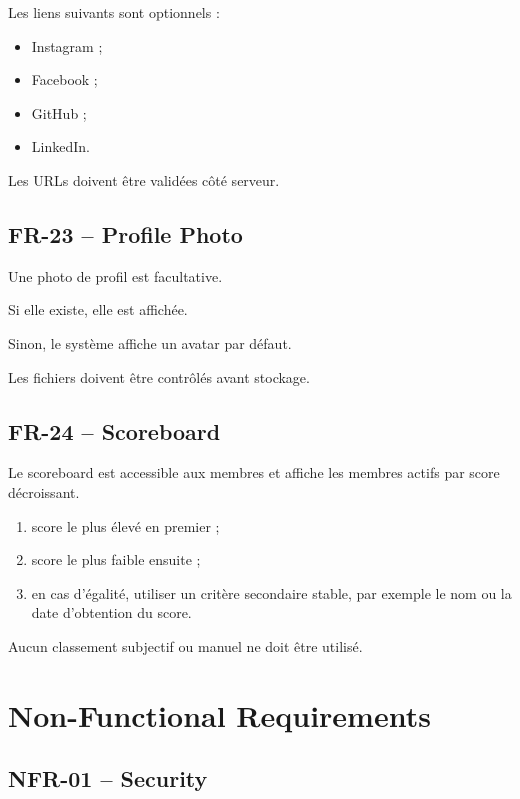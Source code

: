 \documentclass[11pt,a4paper]{report}
\begin{document}
Les liens suivants sont optionnels :

\begin{itemize}
    \item Instagram ;
    \item Facebook ;
    \item GitHub ;
    \item LinkedIn.
\end{itemize}

Les URLs doivent être validées côté serveur.

\section{FR-23 -- Profile Photo}

Une photo de profil est facultative.

Si elle existe, elle est affichée.

Sinon, le système affiche un avatar par défaut.

Les fichiers doivent être contrôlés avant stockage.

\section{FR-24 -- Scoreboard}

Le scoreboard est accessible aux membres et affiche les membres actifs par score décroissant.

\begin{enumerate}
    \item score le plus élevé en premier ;
    \item score le plus faible ensuite ;
    \item en cas d'égalité, utiliser un critère secondaire stable, par exemple le nom ou la date d'obtention du score.
\end{enumerate}

Aucun classement subjectif ou manuel ne doit être utilisé.

\chapter{Non-Functional Requirements}

\section{NFR-01 -- Security}
\end{document}
